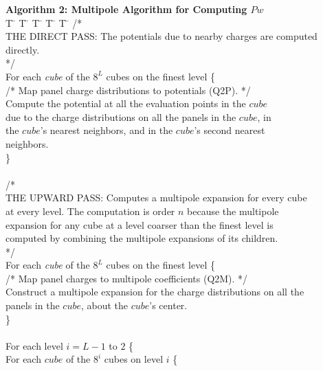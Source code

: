 \begin{tabbing}
{\bf Algorithm 2: Multipole Algorithm for Computing $ Pw $ }\\[0.2in]
T \= \kill
\>T \= \kill
\>\>T \= \kill
\>\>\>T \= \kill
\>\>\>\>T \= \kill
\> /* \\
\> THE DIRECT PASS: The potentials due to nearby charges are computed \\
\> directly. \\
\> */\\
\> For each {\em cube} of the $ 8^L $ cubes on the finest level \{ \\
\> \> /* Map panel charge distributions to potentials (Q2P). */ \\
\> \> Compute the potential at all the evaluation points in the $ cube $\\
\> \> due to the charge distributions on all the panels in the $ cube $, in \\
\> \> the $cube$'s nearest neighbors, and in the $cube$'s second nearest \\
\> \> neighbors.\\
\> \} \\
\\
\> /* \\
\> THE UPWARD PASS: Computes a multipole expansion for every cube\\
\> at every level.  The computation is order $ n $ because the multipole \\
\> expansion for any cube at a level coarser than the finest level is \\
\> computed by combining the multipole expansions of its children.   \\
\> */\\
\> For each {\em cube} of the $ 8^L $ cubes on the finest level \{ \\
\> \> /* Map panel charges to multipole coefficients (Q2M). */\\
\> \> Construct a multipole expansion for the charge distributions on all the\\
\> \> panels in the $ cube $, about the $cube$'s center.\\
\> \} \\
\\
\> For each level $ i = L-1 $ to $ 2 $ \{ \\
\> \> For each $ cube $ of the $ 8^i $ cubes on level $ i $ \{ \\

\end{tabbing}
